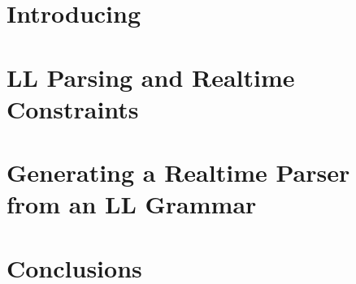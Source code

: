 \documentclass[nonatbib,preprint,numbers]{sigplanconf}
\begin{document}
\section{Introducing \Fajita}
\label{section:fajita}


\section{LL Parsing and Realtime Constraints}
\label{section:intuition}


\section{Generating a Realtime Parser \\ from an LL Grammar}
\label{section:algorithm}


\section{Conclusions}
\label{section:zz}


\small

\end{document}
